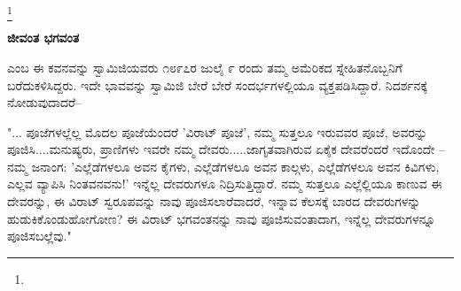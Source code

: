 \protect\footnote{}

\begin{myquote}
\end{myquote}

\begin{myquote}
\end{myquote}

\begin{myquote}
\end{myquote}

\begin{myquote}
\end{myquote}

\begin{center}
\textbf{ಜೀವಂತ ಭಗವಂತ}
\end{center}

 ಎಂಬ ಈ ಕವನವನ್ನು ಸ್ವಾಮಿಜಿಯವರು ೧೮೯೭ರ ಜುಲೈ ೯ ರಂದು ತಮ್ಮ ಅಮೆರಿಕದ ಸ್ನೇಹಿತನೊಬ್ಬನಿಗೆ ಬರೆದುಕಳಿಸಿದ್ದರು. ಇದೇ ಭಾವವನ್ನು ಸ್ವಾಮಿಜಿ ಬೇರೆ ಬೇರೆ ಸಂದರ್ಭಗಳಲ್ಲಿಯೂ ವ್ಯಕ್ತಪಡಿಸಿದ್ದಾರೆ. ನಿದರ್ಶನಕ್ಕೆ ನೋಡುವುದಾದರೆ–

"... ಪೂಜೆಗಳಲ್ಲೆಲ್ಲ ಮೊದಲ ಪೂಜೆಯೆಂದರೆ 'ವಿರಾಟ್ ಪೂಜೆ', ನಮ್ಮ ಸುತ್ತಲೂ ಇರುವವರ ಪೂಜೆ, ಅವರನ್ನು ಪೂಜಿಸಿ....ಮನುಷ್ಯರು, ಪ್ರಾಣಿಗಳು ಇವರೇ ನಮ್ಮ ದೇವರು.....ಜಾಗೃತವಾಗಿರುವ ಏಕೈಕ ದೇವರೆಂದರೆ ಇದೊಂದೇ – ನಮ್ಮ ಜನಾಂಗ: 'ಎಲ್ಲೆಡೆಗಳಲೂ ಅವನ ಕೈಗಳು, ಎಲ್ಲೆಡೆಗಳಲೂ ಅವನ ಕಾಲ್ಗಳು, ಎಲ್ಲೆಡೆಗಳಲೂ ಅವನ ಕಿವಿಗಳು, ಎಲ್ಲವ ವ್ಯಾಪಿಸಿ ನಿಂತವನವನು!' ಇನ್ನೆಲ್ಲ ದೇವರುಗಳೂ ನಿದ್ರಿಸುತ್ತಿದ್ದಾರೆ. ನಮ್ಮ ಸುತ್ತಲೂ ಎಲ್ಲೆಲ್ಲಿಯೂ ಕಾಣುವ ಈ ದೇವರನ್ನು, ಈ ವಿರಾಟ್ ಸ್ವರೂಪವನ್ನು ನಾವು ಪೂಜಿಸಲಾರೆವಾದರೆ, ಇನ್ನಾವ ಕೆಲಸಕ್ಕೆ ಬಾರದ ದೇವರುಗಳನ್ನು ಹುಡುಕಿಕೊಂಡುಹೋಗೋಣ? ಈ ವಿರಾಟ್ ಭಗವಂತನನ್ನು ನಾವು ಪೂಜಿಸುವಂತಾದಾಗ, ಇನ್ನೆಲ್ಲ ದೇವರುಗಳನ್ನೂ ಪೂಜಿಸಬಲ್ಲೆವು."


